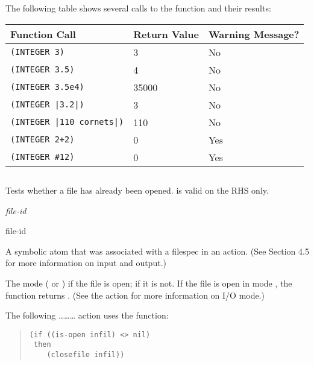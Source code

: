 \Example

The following table shows several calls to the 
function and their results:

\begin{center}
  \begin{tabular}{lll}
    \toprule
    Function Call & Return Value &  Warning Message? \\
    \midrule
    \verb|(INTEGER 3)| &  3 & No \\
    \verb|(INTEGER 3.5)| &  4  & No \\
    \verb|(INTEGER 3.5e4)| &  35000 & No \\
    \verb,(INTEGER |3.2|), &  3 & No \\
    \verb,(INTEGER |110 cornets|), & 110 & No \\
    \verb|(INTEGER 2+2)| &  0 & Yes \\
    \verb|(INTEGER #12)| &  0 & Yes \\
    \bottomrule
  \end{tabular}
\end{center}

\subsection{}

Tests whether a file has already been opened.  is valid on
the RHS only.

\Format

 \it{file-id}

\begin{argument}
\item[file-id]

  A symbolic atom that was associated with a filespec in an
   action. (See Section 4.5 for more information on input
  and output.)
\end{argument}

\ReturnValue

The mode ( or ) if the file is open;  if it is
not.  If the file is open in mode , the function returns
.  (See the  action for more information on I/O
mode.)

\Example

The following \ldots{}\ldots{}\ldots{} action
uses the  function:

\begin{quote}
\begin{verbatim}
(if ((is-open infil) <> nil)
 then
    (closefile infil))
\end{verbatim}
\end{quote}

